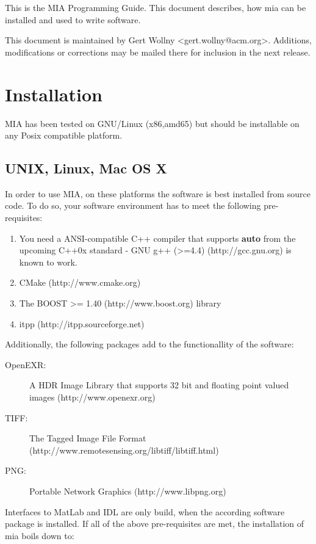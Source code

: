 \documentclass[english, 10pt, a4paper,headsepline,openany]{scrbook}
\begin{document}
This is the MIA Programming Guide. This document describes, how mia can be installed and used to 
  write software. 

This document is maintained by Gert Wollny <gert.wollny@acm.org>. 
Additions, modifications or corrections may be mailed there for inclusion in the next release. 

\section{Installation}

MIA has been tested on GNU/Linux (x86,amd65) but should be installable on any Posix compatible platform. 


\subsection{UNIX, Linux, Mac OS X} 

In order to use MIA, on these platforms the software is best installed from source code. 
To do so, your software environment has to meet the following pre-requisites: 

\begin{enumerate}
\item You need a ANSI-compatible C++ compiler that supports {\bf auto} from the upcoming 
   C++0x standard - GNU g++ (>=4.4) (http://gcc.gnu.org) is known to work. 
\item CMake (http://www.cmake.org) 
\item The BOOST >= 1.40 (http://www.boost.org) library
\item itpp (http://itpp.sourceforge.net) 
\end{enumerate}

Additionally, the following packages add to the functionallity of the software: 

\begin{description}
\item [OpenEXR:] A HDR Image Library that supports 32 bit and floating point valued images (http://www.openexr.org)
\item [TIFF:]    The Tagged Image File Format (http://www.remotesensing.org/libtiff/libtiff.html)
\item [PNG:]     Portable Network Graphics (http://www.libpng.org)
\end{description}

Interfaces to MatLab and IDL are only build, when the according software package is installed.  
If all of the above pre-requisites are met, the installation of mia boils down to:
\end{document}
